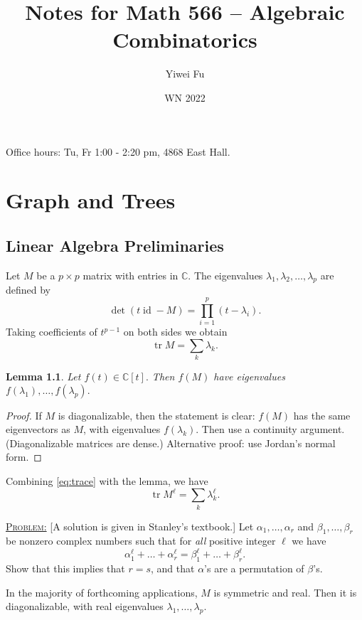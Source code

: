 \documentclass{report}
\newcommand{\C}{\mathbb{C}}
\def \id {\operatorname{id}}
\def \tr {\operatorname{tr}}
\newcommand{\fancyem}[1]{\underline{\textsc{#1}}}
\newtheorem{lemma}{Lemma}[section]
\theoremstyle{definition}
\theoremstyle{remark}
\numberwithin{equation}{section}
\begin{document}
\title{Notes for Math 566 -- Algebraic Combinatorics}
\author{Yiwei Fu}
\date{WN 2022}
\maketitle


\tableofcontents
Office hours: Tu, Fr 1:00 - 2:20 pm, 4868 East Hall.

\clearpage
{}

\chapter{Graph and Trees}
\section{Linear Algebra Preliminaries}
Let $M$ be a $p \times p$ matrix with entries in $\C$. The eigenvalues $\lambda_1, \lambda_2, \ldots, \lambda_p$ are defined by
\[
\det(t\id - M) = \prod_{i=1}^p (t - \lambda_i).
\]
Taking coefficients of $t^{p-1}$ on both sides we obtain
\begin{equation}\label{eq:trace}
\tr{M} = \sum_k \lambda_k.
\end{equation}


\begin{lemma}
Let $f(t) \in \C[t].$ Then $f(M)$ have eigenvalues $f(\lambda_1), \ldots, f(\lambda_p).$\end{lemma}
\begin{proof}
If $M$ is diagonalizable, then the statement is clear: $f(M)$ has the same eigenvectors as $M$, with eigenvalues $f(\lambda_k)$. Then use a continuity argument. (Diagonalizable matrices are dense.) Alternative proof: use Jordan’s normal form.
\end{proof}

Combining \eqref{eq:trace} with the lemma, we have
\begin{equation}\label{eq2}
\tr M^{\ell} = \sum_{k} \lambda_k^\ell.
\end{equation} 

\fancyem{Problem:} [A solution is given in Stanley’s textbook.] Let $\alpha_1, \ldots, \alpha_r$ and $\beta_1, \ldots, \beta_r$ be nonzero complex numbers such that for \emph{all} positive integer $\ell$ we have
\[
\alpha_1^\ell + \ldots + \alpha_r^\ell = \beta_1^\ell + \ldots + \beta_r^\ell.
\]
Show that this implies that $r=s$, and that $\alpha$'s are a permutation of $\beta$'s.

In the majority of forthcoming applications, $M$ is symmetric and real. Then it is diagonalizable, with real eigenvalues $\lambda_1, \ldots, \lambda_p$.
\end{document}
